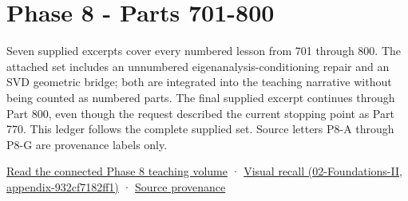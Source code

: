 \section{Phase 8 - Parts 701-800}\label{appendix-fd090d982a15-phase-8---parts-701-800}

Seven supplied excerpts cover every numbered lesson from 701 through 800. The attached set includes an unnumbered eigenanalysis-conditioning repair and an SVD geometric bridge; both are integrated into the teaching narrative without being counted as numbered parts. The final supplied excerpt continues through Part 800, even though the request described the current stopping point as Part 770. This ledger follows the complete supplied set. Source letters P8-A through P8-G are provenance labels only.

\href{Continuous\%20Notes/Computing\%20Foundations\%20-\%20From\%20Bits\%20to\%20C++\%20and\%20Systems\%20APIs\#The\%20graphics\%20problem\%20hiding\%20inside\%20a\%20matrix\%20equation}{Read the connected Phase 8 teaching volume} · \href{../02-Foundations-II/main.pdf\#nameddest=appendix-932cf7182ff1}{Visual recall (02-Foundations-II, appendix-932cf7182ff1)} · \hyperref[appendix-a103e7846d21-phase-8---source-analysis-and-verification]{Source provenance}

